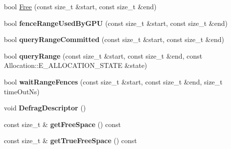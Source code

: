 \begin{DoxyCompactItemize}
\item 
bool \hyperlink{classirr_1_1video_1_1IGPUTransientBuffer_aa575e8d02383688f671e1ed818790d17}{Free} (const size\+\_\+t \&start, const size\+\_\+t \&end)
\item 
bool {\bfseries fence\+Range\+Used\+By\+G\+PU} (const size\+\_\+t \&start, const size\+\_\+t \&end)\hypertarget{classirr_1_1video_1_1IGPUTransientBuffer_a25453b67fc5f499ac06e61e04c338574}{}\label{classirr_1_1video_1_1IGPUTransientBuffer_a25453b67fc5f499ac06e61e04c338574}

\item 
bool {\bfseries query\+Range\+Committed} (const size\+\_\+t \&start, const size\+\_\+t \&end)\hypertarget{classirr_1_1video_1_1IGPUTransientBuffer_a6ba14ee0eee587474da04d3d24a307cf}{}\label{classirr_1_1video_1_1IGPUTransientBuffer_a6ba14ee0eee587474da04d3d24a307cf}

\item 
bool {\bfseries query\+Range} (const size\+\_\+t \&start, const size\+\_\+t \&end, const Allocation\+::\+E\+\_\+\+A\+L\+L\+O\+C\+A\+T\+I\+O\+N\+\_\+\+S\+T\+A\+TE \&state)\hypertarget{classirr_1_1video_1_1IGPUTransientBuffer_adcacd73554da2efeabd7ef440bade85b}{}\label{classirr_1_1video_1_1IGPUTransientBuffer_adcacd73554da2efeabd7ef440bade85b}

\item 
bool {\bfseries wait\+Range\+Fences} (const size\+\_\+t \&start, const size\+\_\+t \&end, size\+\_\+t time\+Out\+Ns)\hypertarget{classirr_1_1video_1_1IGPUTransientBuffer_acb2efc6648dd3457a7b444dd965879a4}{}\label{classirr_1_1video_1_1IGPUTransientBuffer_acb2efc6648dd3457a7b444dd965879a4}

\item 
void {\bfseries Defrag\+Descriptor} ()\hypertarget{classirr_1_1video_1_1IGPUTransientBuffer_ad86d655907dced2d87bb44bc4b3648ec}{}\label{classirr_1_1video_1_1IGPUTransientBuffer_ad86d655907dced2d87bb44bc4b3648ec}

\item 
const size\+\_\+t \& {\bfseries get\+Free\+Space} () const \hypertarget{classirr_1_1video_1_1IGPUTransientBuffer_a679a10b6e9852ea9b554a7a4753a7bda}{}\label{classirr_1_1video_1_1IGPUTransientBuffer_a679a10b6e9852ea9b554a7a4753a7bda}

\item 
const size\+\_\+t \& {\bfseries get\+True\+Free\+Space} () const \hypertarget{classirr_1_1video_1_1IGPUTransientBuffer_ab20491c633e85264b79630e4759a1d70}{}\label{classirr_1_1video_1_1IGPUTransientBuffer_ab20491c633e85264b79630e4759a1d70}

\end{DoxyCompactItemize}
